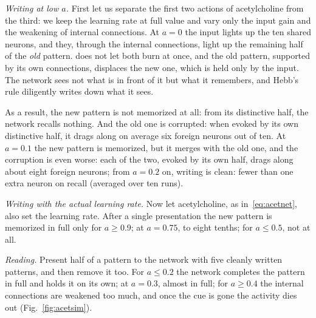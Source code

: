 \emph{Writing at low $a$.} First let us separate the first two actions of acetylcholine from the third: we keep the learning rate at full value and vary only the input gain and the weakening of internal connections. At $a=0$ the input lights up the ten shared neurons, and they, through the internal connections, light up the remaining half of the \emph{old} pattern.  does not let both burn at once, and the old pattern, supported by its own connections, displaces the new one, which is held only by the input. The network sees not what is in front of it but what it remembers, and Hebb's rule diligently writes down what it sees.

As a result, the new pattern is not memorized at all: from its distinctive half, the network recalls nothing. And the old one is corrupted: when evoked by its own distinctive half, it drags along on average six foreign neurons out of ten. At $a=0.1$ the new pattern is memorized, but it merges with the old one, and the corruption is even worse: each of the two, evoked by its own half, drags along about eight foreign neurons; from $a=0.2$ on, writing is clean: fewer than one extra neuron on recall (averaged over ten runs).

\emph{Writing with the actual learning rate.} Now let acetylcholine, as in~\eqref{eq:acetnet}, also set the learning rate. After a single presentation the new pattern is memorized in full only for $a\ge0.9$; at $a=0.75$, to eight tenths; for $a\le0.5$, not at all.

\emph{Reading.} Present half of a pattern to the network with five cleanly written patterns, and then remove it too. For $a\le0.2$ the network completes the pattern in full and holds it on its own; at $a=0.3$, almost in full; for $a\ge0.4$ the internal connections are weakened too much, and once the cue is gone the activity dies out (Fig.~\ref{fig:acetsim}).

